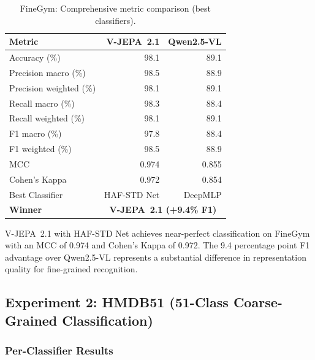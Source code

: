 \begin{table}[H]
\centering
\caption{FineGym: Comprehensive metric comparison (best classifiers).}
\label{tab:fg_comparison}
\begin{tabular}{lrr}
\toprule
\textbf{Metric} & \textbf{V-JEPA~2.1} & \textbf{Qwen2.5-VL} \\
\midrule
Accuracy (\%)         & 98.1 & 89.1 \\
Precision macro (\%)  & 98.5 & 88.9 \\
Precision weighted (\%) & 98.1 & 89.1 \\
Recall macro (\%)     & 98.3 & 88.4 \\
Recall weighted (\%)  & 98.1 & 89.1 \\
F1 macro (\%)         & 97.8 & 88.4 \\
F1 weighted (\%)      & 98.5 & 88.9 \\
MCC                   & 0.974 & 0.855 \\
Cohen's Kappa         & 0.972 & 0.854 \\
Best Classifier       & HAF-STD Net & DeepMLP \\
\midrule
\textbf{Winner}       & \multicolumn{2}{c}{\textbf{V-JEPA~2.1 (+9.4\% F1)}} \\
\bottomrule
\end{tabular}
\end{table}

V-JEPA~2.1 with HAF-STD Net achieves near-perfect classification on FineGym with an MCC of 0.974 and Cohen's Kappa of 0.972. The 9.4 percentage point F1 advantage over Qwen2.5-VL represents a substantial difference in representation quality for fine-grained recognition.


\subsection{Experiment 2: HMDB51 (51-Class Coarse-Grained Classification)}

\subsubsection{Per-Classifier Results}

